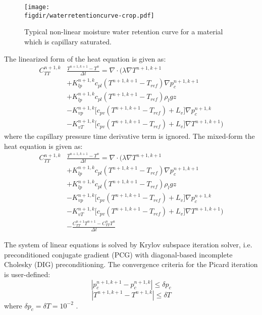 \begin{figure}[t]
	\centering
	\texttt{[image: \\figdir/waterretentioncurve-crop.pdf]}
	\caption{Typical non-linear moisture water retention curve for a material which is capillary saturated.}
	\label{fig:wrc}
\end{figure}

The linearized form of the heat equation is given as:
\begin{equation}
\begin{split}
	C_{\textit{TT}}^{n+1,k}& \frac{T^{n+1,k+1}-T^{n}}{\Delta t} = \nabla \cdot \bigg(\lambda \nabla T^{n+1,k+1} \\
	&+ K_{\textit{lp}}^{n+1,k} c_{\textit{pl}} \left(T^{n+1,k+1} - T_{\textit{ref}}\right)  \nabla p_c^{n+1,k+1} \\
	&+ K_{\textit{lp}}^{n+1,k} c_{\textit{pl}} \left(T^{n+1,k+1} - T_{\textit{ref}}\right) \rho_l g z\\
	&- K_{\textit{vp}}^{n+1,k} \Big[c_{\textit{pv}} \left(T^{n+1,k+1} - T_{\textit{ref}}\right) + L_v\Big] \nabla p_c^{n+1,k} \\ 
	&- K_{\textit{vT}}^{n+1,k} \Big[c_{\textit{pv}} \left(T^{n+1,k+1} - T_{\textit{ref}}\right) + L_v\Big] \nabla T^{n+1,k+1} \bigg)
\end{split}
\end{equation}
where the capillary pressure time derivative term is ignored. The mixed-form the heat equation is given as:
\begin{equation}
\begin{split}
C_{\textit{TT}}^{n+1,k}&\frac{T^{n+1,k+1}-T^{n}}{\Delta t} = \nabla \cdot \bigg(\lambda \nabla T^{n+1,k+1} \\
&+ K_{\textit{lp}}^{n+1,k} c_{\textit{pl}} \left(T^{n+1,k+1} - T_{\textit{ref}}\right)  \nabla p_c^{n+1,k+1} \\
&+ K_{\textit{lp}}^{n+1,k} c_{\textit{pl}} \left(T^{n+1,k+1} - T_{\textit{ref}}\right) \rho_l g z\\
&- K_{\textit{vp}}^{n+1,k} \Big[c_{\textit{pv}} \left(T^{n+1,k+1} - T_{\textit{ref}}\right) + L_v\Big] \nabla p_c^{n+1,k} \\
&- K_{\textit{vT}}^{n+1,k} \Big[c_{\textit{pv}} \left(T^{n+1,k+1} - T_{\textit{ref}}\right) + L_v\Big] \nabla T^{n+1,k+1} \bigg)\\
&- \frac{C_{TT}^{n+1}T^{n+1} - C_{TT}^{n}T^{n}}{\Delta t}
\end{split}
\end{equation}


The system of linear equations is solved by Krylov subspace iteration solver, i.e. preconditioned conjugate gradient (PCG) with diagonal-based incomplete Cholesky (DIG) preconditioning. The convergence criteria for the Picard iteration is user-defined: 
\begin{equation}
\left| p_c^{n+1,k+1} - p_c^{n+1,k}\right| \le \delta p_c
\end{equation}
\begin{equation}
\left| T^{n+1,k+1} - T^{n+1,k}\right| \le \delta T
\end{equation}
where $\delta p_c = \delta T = 10^{-2}$ \citep{Kubilay2018}.

